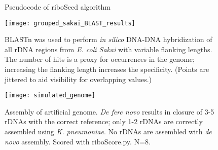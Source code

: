 \begin{figure}[h]
  \centering
  \begin{minipage}{.6\linewidth}
    \begin{algorithm}[H]
    \end{algorithm}
  \end{minipage}
  \caption{Pseudocode of riboSeed algorithm}
  \label{fig:algo}
\end{figure}


\begin{figure}[H]
  \centering
  \hspace*{0cm}\texttt{[image: grouped\_sakai\_BLAST\_results]}
  \caption{BLASTn was used to perform \textit{in silico} DNA-DNA hybridization of all rDNA regions from \textit{E. coli Sakai} with variable flanking lengths. The number of hits is a proxy for occurrences in the genome; increasing the flanking length increases the specificity. (Points are jittered to aid visibility for overlapping values.)}
  \label{fig:blast}
\end{figure}

\begin{figure}[H]
    \centering
    \hspace*{0cm}\texttt{[image: simulated\_genome]}
    \caption{Assembly of artificial genome. \textit{De fere novo} results in closure of 3-5 rDNAs with the correct reference; only 1-2 rDNAs are correctly assembled using \textit{K. pneumoniae}.  No rDNAs are assembled with \textit{de novo} assembly. Scored with riboScore.py. N=8.}
    \label{fig:simgenome}
\end{figure}



